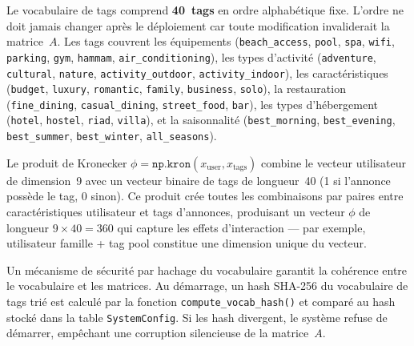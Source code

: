 Le vocabulaire de tags comprend \textbf{40~tags} en ordre alphabétique fixe. L'ordre ne doit
jamais changer après le déploiement car toute modification invaliderait la matrice~$A$. Les
tags couvrent les équipements (\texttt{beach\_access}, \texttt{pool}, \texttt{spa}, \texttt{wifi},
\texttt{parking}, \texttt{gym}, \texttt{hammam}, \texttt{air\_conditioning}), les types
d'activité (\texttt{adventure}, \texttt{cultural}, \texttt{nature}, \texttt{activity\_outdoor},
\texttt{activity\_indoor}), les caractéristiques (\texttt{budget}, \texttt{luxury},
\texttt{romantic}, \texttt{family}, \texttt{business}, \texttt{solo}), la restauration
(\texttt{fine\_dining}, \texttt{casual\_dining}, \texttt{street\_food}, \texttt{bar}), les types
d'hébergement (\texttt{hotel}, \texttt{hostel}, \texttt{riad}, \texttt{villa}), et la saisonnalité
(\texttt{best\_morning}, \texttt{best\_evening}, \texttt{best\_summer}, \texttt{best\_winter},
\texttt{all\_seasons}).

Le produit de Kronecker $\phi = \texttt{np.kron}(x_{\text{user}}, x_{\text{tags}})$ combine
le vecteur utilisateur de dimension~9 avec un vecteur binaire de tags de longueur~40 (1 si
l'annonce possède le tag, 0 sinon). Ce produit crée toutes les combinaisons par paires entre
caractéristiques utilisateur et tags d'annonces, produisant un vecteur $\phi$ de longueur
$9 \times 40 = 360$ qui capture les effets d'interaction --- par exemple, \og{}utilisateur
famille + tag pool\fg{} constitue une dimension unique du vecteur.

Un mécanisme de sécurité par hachage du vocabulaire garantit la cohérence entre le vocabulaire
et les matrices. Au démarrage, un hash SHA-256 du vocabulaire de tags trié est calculé par la
fonction \texttt{compute\_vocab\_hash()} et comparé au hash stocké dans la table
\texttt{SystemConfig}. Si les hash divergent, le système refuse de démarrer, empêchant une
corruption silencieuse de la matrice~$A$.

